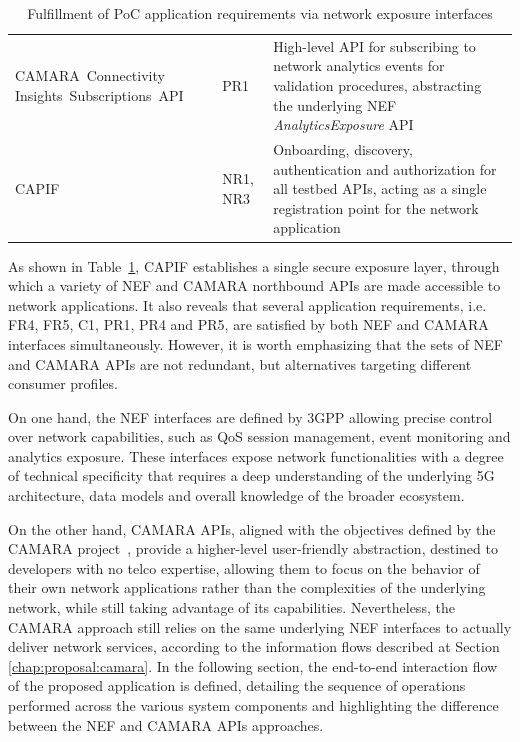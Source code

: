 \begin{table}[ht]
\begin{tabular}{p{3.9cm} p{1.4cm} p{8.1cm}}
\mbox{CAMARA Connectivity} \mbox{Insights Subscriptions \acs{API}} & PR1 & High-level \acs{API} for subscribing to network analytics events for validation procedures, abstracting the underlying \acs{NEF} \textit{AnalyticsExposure} \acs{API} \\
\acs{CAPIF} & NR1, NR3 & Onboarding, discovery, authentication and authorization for all testbed \acsp{API}, acting as a single registration point for the network application \\
\bottomrule
\end{tabular}
\caption{Fulfillment of \acs{PoC} application requirements via network exposure interfaces}
\label{tab:poc:api:mapping}
\end{table}

As shown in Table~\ref{tab:poc:api:mapping}, \acs{CAPIF} establishes a single secure exposure layer, through which a variety of \acs{NEF} and CAMARA northbound \acsp{API} are made accessible to network applications. It also reveals that several application requirements, i.e. FR4, FR5, C1, PR1, PR4 and PR5, are satisfied by both \acs{NEF} and CAMARA interfaces simultaneously. However, it is worth emphasizing that the sets of \acs{NEF} and CAMARA \acsp{API} are not redundant, but alternatives targeting different consumer profiles.

On one hand, the \acs{NEF} interfaces are defined by \acs{3GPP} allowing precise control over network capabilities, such as \acs{QoS} session management, event monitoring and analytics exposure. These interfaces expose network functionalities with a degree of technical specificity that requires a deep understanding of the underlying \acs{5G} architecture, data models and overall knowledge of the broader ecosystem.

On the other hand, CAMARA \acsp{API}, aligned with the objectives defined by the CAMARA project~\cite{CAMARAProject}, provide a higher-level user-friendly abstraction, destined to developers with no telco expertise, allowing them to focus on the behavior of their own network applications rather than the complexities of the underlying network, while still taking advantage of its capabilities. Nevertheless, the CAMARA approach still relies on the same underlying \acs{NEF} interfaces to actually deliver network services, according to the information flows described at Section \ref{chap:proposal:camara}. In the following section, the end-to-end interaction flow of the proposed application is defined, detailing the sequence of operations performed across the various system components and highlighting the difference between the \acs{NEF} and CAMARA \acsp{API} approaches.

